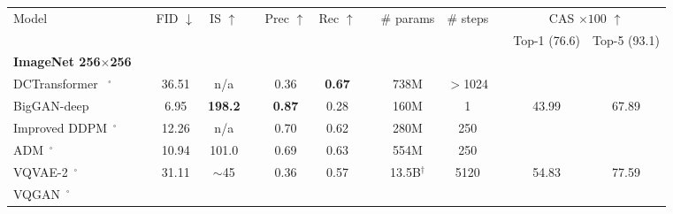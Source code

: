 
\begin{table}[ht]
\small
    \centering
    {\small
    \begin{tabular}{lc ccc ccc ccc cc}
    \toprule
     {Model} & 
    
     & {FID}  $\downarrow$ & {IS}  $\uparrow$ & 
     &  {Prec}  $\uparrow$ & {Rec}   $\uparrow$ &
     
     &{\# params} & {\# steps} &
     
     & \multicolumn{2}{c}{{CAS $\times 100$} $\uparrow$}  
     \\
     \cline{12-13}
    &&  && & &&& & && {Top-1 (76.6)} & {Top-5 (93.1)} \\[-7pt]
    \textbf{ImageNet 256$\times$256} && &&& &&& &&& &
    \\[-2pt]
    \midrule
    
    DCTransformer~\cite{nash2021generating} $^\square$ &
    & 36.51 & n/a &
    & 0.36 & \textbf{0.67} &
    & 738M & $>$1024 &   & &
     \\ 
    
    BigGAN-deep~\cite{biggan}  & %
    & 6.95 & \bfseries{198.2} &
    & \textbf{0.87} & 0.28 &
    & 160M & 1 & & 43.99 &67.89
    \\
    
    Improved DDPM~\cite{nichol2021improved}$^\square$  &
    & 12.26 & n/a  &
    & 0.70 & 0.62 &
     & 280M & 250  &  &  & \\
    
    ADM~\cite{dhariwal2021diffusion}$^\square$   & 
    & 10.94 & 101.0  &
    & 0.69 & 0.63 &
    & 554M & 250 &  &  & \\
    

    
    VQVAE-2~\cite{Razavi19vqvae2}$^\square$ &
    & 31.11 & $\sim$45 &
    & 0.36 & 0.57 &
    & 13.5B$^\dagger$ & 5120 & & 54.83 & 77.59 \\
    \midrule
    VQGAN~\cite{Esser21vqgan}$^\square$ &
    

\end{tabular}}
\end{table}
